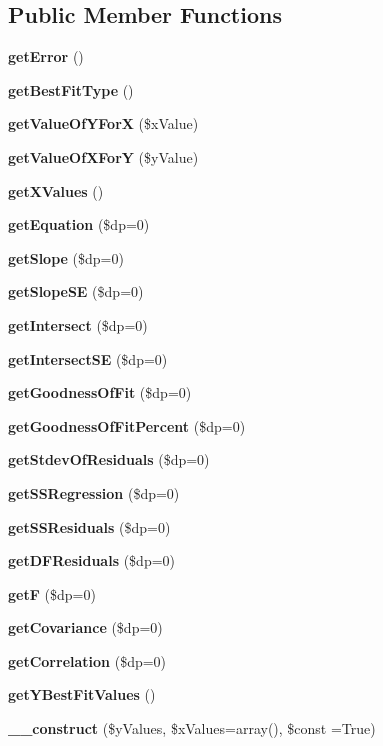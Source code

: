\subsection*{Public Member Functions}
\begin{DoxyCompactItemize}
\item 
{\bfseries get\+Error} ()\label{class_p_h_p_excel___best___fit_a24ada5decce3d1b79cd82f5a90ccf404}

\item 
{\bfseries get\+Best\+Fit\+Type} ()\label{class_p_h_p_excel___best___fit_a5f14cc4080d2a457a7631ca8e026abc2}

\item 
{\bf get\+Value\+Of\+Y\+For\+X} (\$x\+Value)
\item 
{\bf get\+Value\+Of\+X\+For\+Y} (\$y\+Value)
\item 
{\bf get\+X\+Values} ()
\item 
{\bf get\+Equation} (\$dp=0)
\item 
{\bf get\+Slope} (\$dp=0)
\item 
{\bf get\+Slope\+S\+E} (\$dp=0)
\item 
{\bf get\+Intersect} (\$dp=0)
\item 
{\bf get\+Intersect\+S\+E} (\$dp=0)
\item 
{\bf get\+Goodness\+Of\+Fit} (\$dp=0)
\item 
{\bfseries get\+Goodness\+Of\+Fit\+Percent} (\$dp=0)\label{class_p_h_p_excel___best___fit_a1fb2fdd45e03e7af9716a3ffb03e7bad}

\item 
{\bf get\+Stdev\+Of\+Residuals} (\$dp=0)
\item 
{\bfseries get\+S\+S\+Regression} (\$dp=0)\label{class_p_h_p_excel___best___fit_acacfb25e75e78a9f2be6d9f9cafda445}

\item 
{\bfseries get\+S\+S\+Residuals} (\$dp=0)\label{class_p_h_p_excel___best___fit_a3cf07620d8d4e6effabba8d611145a68}

\item 
{\bfseries get\+D\+F\+Residuals} (\$dp=0)\label{class_p_h_p_excel___best___fit_a4efa49de971762bf3224d61dafd0fab3}

\item 
{\bfseries get\+F} (\$dp=0)\label{class_p_h_p_excel___best___fit_a6ad2d57d92af90891a63d623fc9b9265}

\item 
{\bfseries get\+Covariance} (\$dp=0)\label{class_p_h_p_excel___best___fit_a0a194384004d0f3d21d10ee1e65de7e6}

\item 
{\bfseries get\+Correlation} (\$dp=0)\label{class_p_h_p_excel___best___fit_a7d5506e6fa6f8383198a7d3d5708bfbc}

\item 
{\bfseries get\+Y\+Best\+Fit\+Values} ()\label{class_p_h_p_excel___best___fit_a129a59c30a56a507f97ef4c3565d6f92}

\item 
{\bf \+\_\+\+\_\+construct} (\$y\+Values, \$x\+Values=array(), \$const =True)
\end{DoxyCompactItemize}
